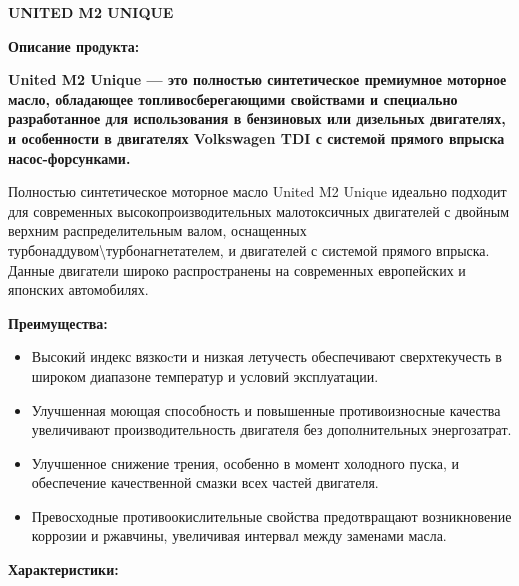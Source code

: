 \documentclass[12pt,a4paper]{article}
\begin{document}
\begin{spacing}{2.5}
{\textbf{\fontsize{20pt}{30pt}\selectfont UNITED M2 UNIQUE}}
\end{spacing}

\begin{spacing}{2.5}
{\textbf{\fontsize{14pt}{4pt}\selectfont Описание продукта:}}
\end{spacing}

{\textbf{United M2 Unique — это полностью синтетическое премиумное моторное масло, обладающее топливосберегающими свойствами и специально разработанное для использования в бензиновых или дизельных двигателях, и особенности в двигателях Volkswagen TDI с системой прямого впрыска насос-форсунками.}

Полностью синтетическое моторное масло United M2 Unique идеально подходит для современных высокопроизводительных малотоксичных двигателей с двойным верхним распределительным валом, оснащенных турбонаддувом\textbackslash  турбонагнетателем, и двигателей с системой прямого впрыска. Данные двигатели широко распространены на современных европейских и японских автомобилях. 

\bigskip
{\textbf{\fontsize{14pt}{10pt}\selectfont Преимущества:}}


\begin{itemize}[itemsep=1.4pt]
\item Высокий индекс вязкоcти и низкая летучесть обеспечивают сверхтекучесть в широком диапазоне температур и условий эксплуатации.
\item Улучшенная моющая способность и повышенные противоизносные качества увеличивают производительность двигателя без дополнительных энергозатрат.
\item Улучшенное снижение трения, особенно в момент холодного пуска, и обеспечение качественной смазки всех частей двигателя.
\item Превосходные противоокислительные свойства предотвращают возникновение коррозии и ржавчины, увеличивая интервал между заменами масла. 
\end{itemize}

\begin{spacing}{1}
{\textbf{\fontsize{14pt}{4pt}\selectfont Характеристики:}}
\end{spacing}

}
\end{document}
